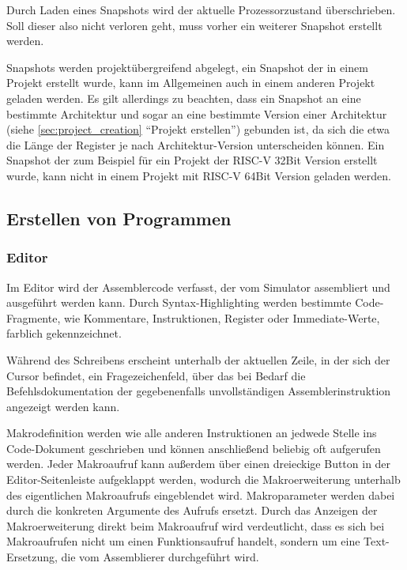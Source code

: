 \begin{warningblock}
Durch Laden eines Snapshots wird der aktuelle Prozessorzustand überschrieben.
Soll dieser also nicht verloren geht, muss vorher ein weiterer Snapshot erstellt
werden.
\end{warningblock}

Snapshots werden projektübergreifend abgelegt, ein Snapshot der in einem Projekt
erstellt wurde, kann im Allgemeinen auch in einem anderen Projekt geladen
werden. Es gilt allerdings zu beachten, dass ein Snapshot an eine bestimmte
Architektur und sogar an eine bestimmte Version einer Architektur (siehe
\ref{sec:project_creation} ``Projekt erstellen'') gebunden ist, da sich die etwa
die Länge der Register je nach Architektur-Version unterscheiden können. Ein
Snapshot der zum Beispiel für ein Projekt der RISC-V 32Bit Version erstellt
wurde, kann nicht in einem Projekt mit RISC-V 64Bit Version geladen werden.

\subsection{Erstellen von Programmen}

\subsubsection{Editor}
\label{sec:Editor}

Im Editor wird der Assemblercode verfasst, der vom Simulator assembliert und
ausgeführt werden kann. Durch Syntax-Highlighting werden bestimmte
Code-Fragmente, wie Kommentare, Instruktionen, Register oder Immediate-Werte,
farblich gekennzeichnet.

Während des Schreibens erscheint unterhalb der aktuellen Zeile, in der sich der
Cursor befindet, ein Fragezeichenfeld, über das bei Bedarf die
Befehlsdokumentation der gegebenenfalls unvollständigen Assemblerinstruktion
angezeigt werden kann.

Makrodefinition werden wie alle anderen Instruktionen an jedwede Stelle ins
Code-Dokument geschrieben und können anschließend beliebig oft aufgerufen
werden. Jeder Makroaufruf kann außerdem über einen dreieckige Button in
der Editor-Seitenleiste aufgeklappt werden, wodurch die Makroerweiterung
unterhalb des eigentlichen Makroaufrufs eingeblendet wird. Makroparameter werden
dabei durch die konkreten Argumente des Aufrufs ersetzt. Durch das Anzeigen der
Makroerweiterung direkt beim Makroaufruf wird verdeutlicht, dass es sich bei
Makroaufrufen nicht um einen Funktionsaufruf handelt, sondern um eine
Text-Ersetzung, die vom Assemblierer durchgeführt wird.

